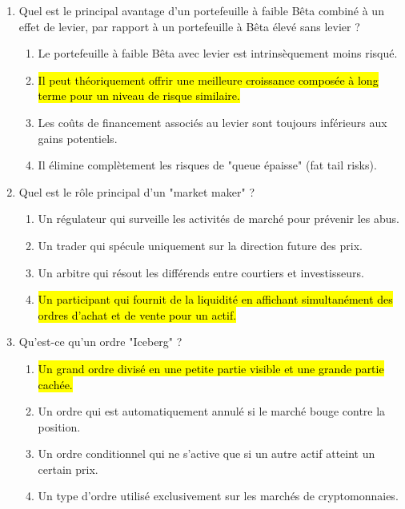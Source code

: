\documentclass[a4paper,12pt]{article}
\begin{document}
\begin{enumerate}
    \item Quel est le principal avantage d'un portefeuille à faible Bêta combiné à un effet de levier, par rapport à un portefeuille à Bêta élevé sans levier ?
    \begin{enumerate}[label=(\Alph*)]
        \item Le portefeuille à faible Bêta avec levier est intrinsèquement moins risqué.
        \item \hl{Il peut théoriquement offrir une meilleure croissance composée à long terme pour un niveau de risque similaire.}
        \item Les coûts de financement associés au levier sont toujours inférieurs aux gains potentiels.
        \item Il élimine complètement les risques de "queue épaisse" (fat tail risks).
    \end{enumerate}
    
    \item Quel est le rôle principal d'un "market maker" ?
    \begin{enumerate}[label=(\Alph*)]
        \item Un régulateur qui surveille les activités de marché pour prévenir les abus.
        \item Un trader qui spécule uniquement sur la direction future des prix.
        \item Un arbitre qui résout les différends entre courtiers et investisseurs.
        \item \hl{Un participant qui fournit de la liquidité en affichant simultanément des ordres d'achat et de vente pour un actif.}
    \end{enumerate}

    \item Qu'est-ce qu'un ordre "Iceberg" ?
    \begin{enumerate}[label=(\Alph*)]
        \item \hl{Un grand ordre divisé en une petite partie visible et une grande partie cachée.}
        \item Un ordre qui est automatiquement annulé si le marché bouge contre la position.
        \item Un ordre conditionnel qui ne s'active que si un autre actif atteint un certain prix.
        \item Un type d'ordre utilisé exclusivement sur les marchés de cryptomonnaies.
    \end{enumerate}


\end{enumerate}
\end{document}
